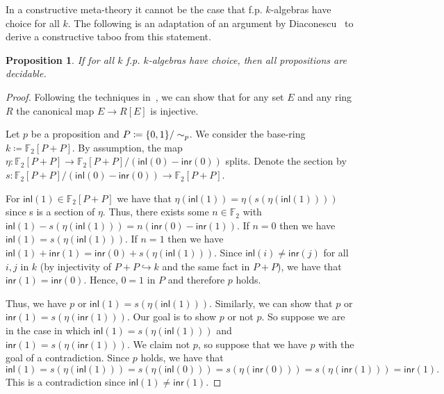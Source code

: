 \documentclass[10pt,a4paper]{article}
\newtheorem{proposition}[theorem]{Proposition}
\theoremstyle{definition}
\theoremstyle{remark}
\newcommand\inl{\mathsf{inl}}
\newcommand\inr{\mathsf{inr}}
\DeclarePairedDelimiter\set{\{}{\}}
\begin{document}

In a constructive meta-theory it cannot be the case that f.p. \(k\)-algebras have choice for all \(k\).
The following is an adaptation of an argument by Diaconescu~\cite{diaconescu1975choice} to derive a constructive taboo from this statement.

\begin{proposition}
  If for all \(k\) f.p. \(k\)-algebras have choice, then all propositions are decidable.
\end{proposition}
\begin{proof}
  Following the techniques in~\cite{mines}, we can show that for any set $E$ and any ring $R$ the canonical map $E \to R[E]$ is injective.

  Let $p$ be a proposition and $P \coloneqq \set{0,1} / \sim_p$.
  We consider the base-ring $k \coloneqq \mathbb{F}_2[P + P]$.
  By assumption, the map $\eta \colon \mathbb{F}_2[P + P] \to \mathbb{F}_2[P + P] / (\inl(0) - \inr(0))$ splits.
  Denote the section by $s : \mathbb{F}_2[P + P] / (\inl(0) - \inr(0)) \to \mathbb{F}_2[P + P]$.

  For $\inl(1) \in \mathbb{F}_2[P + P]$ we have that $\eta(\inl(1)) = \eta(s(\eta(\inl(1))))$ since s is a section of $\eta$.
  Thus, there exists some $n \in \mathbb{F}_2$ with $\inl(1) - s(\eta(\inl(1))) = n(\inr(0) - \inr(1))$.
  If $n = 0$ then we have $\inl(1) = s(\eta(\inl(1)))$.
  If $n = 1$ then we have $\inl(1) + \inr(1) = \inr(0) + s(\eta(\inl(1)))$.
  Since $\inl(i) \ne \inr(j)$ for all $i, j$ in $k$ (by injectivity of $P + P \hookrightarrow k$ and the same fact in $P + P$), we have that $\inr(1) = \inr(0)$.
  Hence, $0 = 1$ in $P$ and therefore $p$ holds.

  Thus, we have $p$ or $\inl(1) = s(\eta(\inl(1)))$.
  Similarly, we can show that $p$ or $\inr(1) = s(\eta(\inr(1)))$.
  Our goal is to show $p$ or not $p$.
  So suppose we are in the case in which $\inl(1) = s(\eta(\inl(1)))$ and $\inr(1) = s(\eta(\inr(1)))$.
  We claim not $p$, so suppose that we have $p$ with the goal of a contradiction.
  Since $p$ holds, we have that
  \[
    \inl(1) = s(\eta(\inl(1))) = s(\eta(\inl(0))) = s(\eta(\inr(0))) = s(\eta(\inr(1))) = \inr(1).
  \]
  This is a contradiction since $\inl(1) \ne \inr(1)$.
\end{proof}
\end{document}
